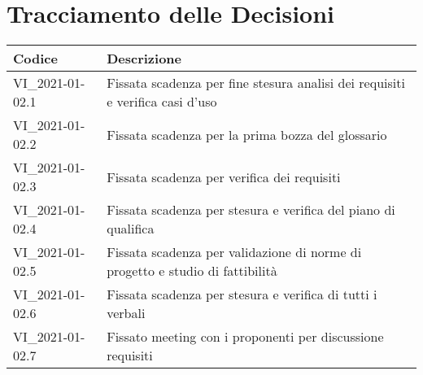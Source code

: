 \section*{Tracciamento delle Decisioni}

\begin{center}
	\begin{longtable}{|p{3.5cm}|p{11cm}|}
		\hline
		\rowcolor{lighter-grayer}
		\textbf{Codice} & \textbf{Descrizione} \\
		\hline
		\endfirsthead

		\hline
		VI\_2021-01-02.1 & Fissata scadenza per fine stesura analisi dei requisiti e verifica casi d'uso \\
		VI\_2021-01-02.2 & Fissata scadenza per la prima bozza del glossario \\
		VI\_2021-01-02.3 & Fissata scadenza per verifica dei requisiti \\
		VI\_2021-01-02.4 & Fissata scadenza per stesura e verifica del piano di qualifica \\
		VI\_2021-01-02.5 & Fissata scadenza per validazione di norme di progetto e studio di fattibilità \\
		VI\_2021-01-02.6 & Fissata scadenza per stesura e verifica di tutti i verbali \\
		VI\_2021-01-02.7 & Fissato meeting con i proponenti per discussione requisiti \\
		\hline
	\end{longtable}
\end{center}